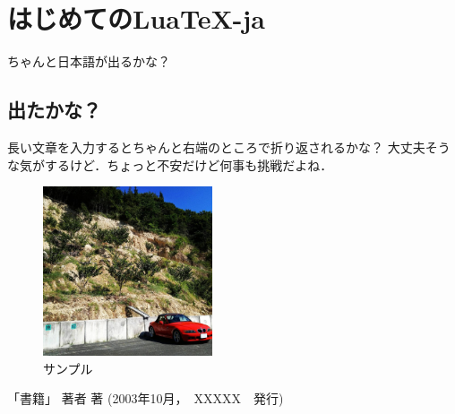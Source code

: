 \documentclass[a4j,11pt]{ltjsarticle}
\begin{document}
    \section{はじめてのLua\TeX-ja}
        ちゃんと日本語が出るかな？

        \subsection{出たかな？}
            長い文章を入力するとちゃんと右端のところで折り返されるかな？
            大丈夫そうな気がするけど．ちょっと不安だけど何事も挑戦だよね．

            \begin{figure}[h]
                \centering
                \includegraphics[width=5cm]{fig/sample.jpg}
                \caption{サンプル}
                \label{fig:sample}
            \end{figure}

        \begin{thebibliography}{1}
             「書籍」 著者 著 (2003年10月，　XXXXX　発行)
        \end{thebibliography}
\end{document}
